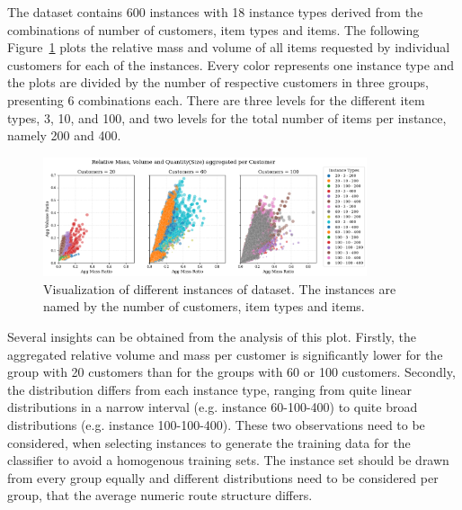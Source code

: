 The dataset contains 600 instances with 18 instance types derived from the combinations
of number of customers, item types and items. The following Figure~\ref{fig:krebs_dataset_analysis_detailes} plots
the relative mass and volume of all items requested by individual customers for each of the instances. Every color
represents one instance type and the plots are divided by the number of respective customers in three groups, presenting
6 combinations each. There are three levels for the different item types, 3, 10, and 100, and two levels for the total
number of items per instance, namely 200 and 400.
\begin{figure}[ht]
	\centering
	\includegraphics[width=0.85\textwidth]{pictures/krebs_instances_detailed.png}
	\caption[Visualization of different instances of \textcite{krebs_advanced_2021} dataset.]{Visualization of different instances of \krebsADataSetText dataset.
		The instances are named by the number of customers, item types and items.}
	\label{fig:krebs_dataset_analysis_detailes}
\end{figure}%
Several insights can be obtained from the analysis of this plot. Firstly, the aggregated relative
volume and mass per customer is significantly lower for the group with 20 customers than for the groups with 60 or 100 customers.
Secondly, the distribution differs from each instance type, ranging from quite linear distributions in a narrow
interval (e.g. instance 60-100-400) to quite broad distributions (e.g. instance 100-100-400). These two observations need to be considered,
when selecting instances to generate the training data for the classifier to avoid a homogenous training sets.
The instance set should be drawn from every group equally and different distributions need to be considered per group,
that the average numeric route structure differs.

\subsubsection{\gendreauDataSetText}

